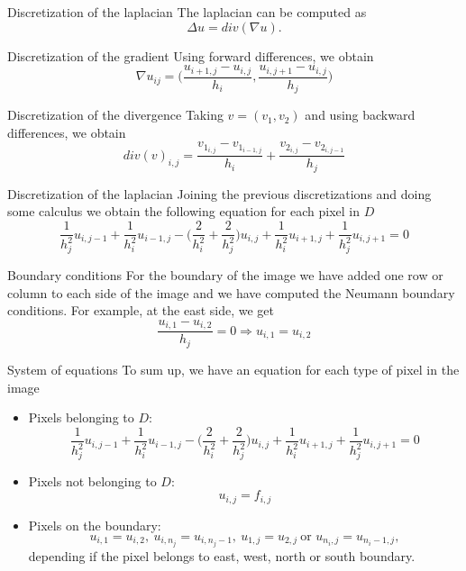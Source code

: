 \documentclass[11pt]{beamer}
\begin{document}
\begin{frame}{Discretization of the laplacian}
The laplacian can be computed as
$$\Delta u = div(\nabla u).$$

\begin{block}{Discretization of the gradient}
Using forward differences, we obtain
$$\nabla u_{ij} = \bigg(\frac{u_{i+1,j} - u_{i,j}}{h_i}, \frac{u_{i,j+1} - u_{i,j}}{h_j}\bigg)$$
\end{block}
\begin{block}{Discretization of the divergence}
Taking $v = (v_1, v_2)$ and using backward differences, we obtain
$$div(v)_{i,j} = \frac{v_{1_{i,j}} - v_{1_{i-1,j}}}{h_i} + \frac{v_{2_{i,j}} - v_{2_{i,j-1}}}{h_j}$$
\end{block}
\end{frame}

\begin{frame}{Discretization of the laplacian}
Joining the previous discretizations and doing some calculus we obtain the following equation for each pixel in $D$
$$\frac{1}{h_j^2}u_{i,j-1} + \frac{1}{h_i^2}u_{i-1, j} - \bigg(\frac{2}{h_i^2}+\frac{2}{h_j^2}\bigg)u_{i,j} + \frac{1}{h_i^2}u_{i+1,j} + \frac{1}{h_j^2}u_{i, j+1} = 0$$


\end{frame}

\begin{frame}{Boundary conditions}
For the boundary of the image we have added one row or column to each side of the image and we have computed the Neumann boundary conditions. For example, at the east side, we get
$$\frac{u_{i, 1} - u_{i, 2}}{h_j} = 0\Longrightarrow u_{i,1} = u_{i, 2}$$

\end{frame}

\begin{frame}{System of equations}
To sum up, we have an equation for each type of pixel in the image
\begin{itemize}
\item Pixels belonging to $D$:
$$\frac{1}{h_j^2}u_{i,j-1} + \frac{1}{h_i^2}u_{i-1, j} - \bigg(\frac{2}{h_i^2}+\frac{2}{h_j^2}\bigg)u_{i,j} + \frac{1}{h_i^2}u_{i+1,j} + \frac{1}{h_j^2}u_{i, j+1} = 0$$
\item Pixels not belonging to $D$:
$$u_{i, j} = f_{i, j}$$
\item Pixels on the boundary:
$$u_{i,1} = u_{i, 2},\ u_{i,n_j} = u_{i, n_j-1},\ u_{1,j} = u_{2, j}\ \text{or } u_{n_i,j} = u_{n_i-1, j},$$
depending if the pixel belongs to east, west, north or south boundary.
\end{itemize}
\end{frame}
\end{document}
